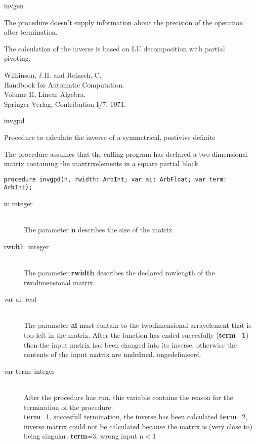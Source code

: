 \documentclass{report}
\newcommand{\FunctionDescription}{\item[Description]\rmfamily}
\newcommand{\Dataorganisation}{\item[Data Struct]\rmfamily}
\newcommand{\DeclarationandParams}{\item[Declaration]\rmfamily}
\newcommand{\References}{\item[References]\rmfamily}
\newcommand{\Method}{\item[Method]\rmfamily}
\newcommand{\Precision}{\item[Precision]\rmfamily}
\newcommand{\Remarks}{\item[Remarks]\rmfamily}
\begin{document}
\begin{procedure}{invgen}
\Precision

The procedure doesn't supply information about the precision of the
operation after termination.

\Method

The calculation of the inverse is based on LU decomposition with partial
pivoting.

\References

 Wilkinson, J.H. and Reinsch, C.\\
 Handbook for Automatic Computation.\\
 Volume II, Linear Algebra.\\
 Springer Verlag, Contribution I/7, 1971.

\end{procedure}

\begin{procedure}{invgpd}

\FunctionDescription

Procedure to calculate the inverse of a symmetrical, postivive definite


\Dataorganisation
The procedure assumes that the calling program has declared a two dimensional
matrix containing the maxtrixelements in a square partial block.

\DeclarationandParams

\lstinline|procedure invgpd(n, rwidth: ArbInt; var ai: ArbFloat; var term: ArbInt);|

\begin{description}
 \item[n: integer] \mbox{ } \\
    The parameter {\bf n} describes the size of the matrix
 \item[rwidth: integer] \mbox{} \\
    The parameter {\bf rwidth} describes the declared rowlength of the twodimensional
    matrix.
 \item[var ai: real] \mbox{} \\
    The parameter {\bf ai} must contain to the twodimensional arrayelement
    that is top-left in the matrix.
    After the function has ended succesfully (\textbf{term=1}) then 
    the input matrix has been changed into its inverse, otherwise the contents 
    of the input matrix are undefined.
    ongedefinieerd.
 \item[var term: integer]  \mbox{} \\
    After the procedure has run, this variable contains the reason for 
    the termination of the procedure:\\
      {\bf term}=1, succesfull termination, the inverse has been calculated
      {\bf term}=2, inverse matrix could not be calculated because the matrix
		    is (very close to) being singular.
      {\bf term}=3, wrong input n$<$1
\end{description}
\Remarks


\end{procedure}
\end{document}
